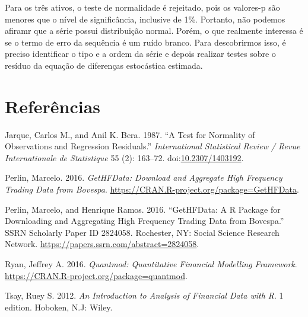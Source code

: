 \documentclass[]{article}
\begin{document}
Para os três ativos, o teste de normalidade é rejeitado, pois os
valores-p são menores que o nível de significância, inclusive de 1\%.
Portanto, não podemos afiramr que a série possui distribuição normal.
Porém, o que realmente interessa é se o termo de erro da sequência é um
ruído branco. Para descobrirmos isso, é preciso identificar o tipo e a
ordem da série e depois realizar testes sobre o resíduo da equação de
diferenças estocástica estimada.

\section*{Referências}\label{referencias}

\setlength{\parindent}{0in}

\hypertarget{refs}{}
\hypertarget{ref-jarqueux5ftestux5f1987}{}
Jarque, Carlos M., and Anil K. Bera. 1987. ``A Test for Normality of
Observations and Regression Residuals.'' \emph{International Statistical
Review / Revue Internationale de Statistique} 55 (2): 163--72.
doi:\href{https://doi.org/10.2307/1403192}{10.2307/1403192}.

\hypertarget{ref-perlinux5fgethfdata:ux5f2016}{}
Perlin, Marcelo. 2016. \emph{GetHFData: Download and Aggregate High
Frequency Trading Data from Bovespa}.
\url{https://CRAN.R-project.org/package=GetHFData}.

\hypertarget{ref-perlinux5fgethfdata:ux5f2016-1}{}
Perlin, Marcelo, and Henrique Ramos. 2016. ``GetHFData: A R Package for
Downloading and Aggregating High Frequency Trading Data from Bovespa.''
SSRN Scholarly Paper ID 2824058. Rochester, NY: Social Science Research
Network. \url{https://papers.ssrn.com/abstract=2824058}.

\hypertarget{ref-ryanux5fquantmod:ux5f2016}{}
Ryan, Jeffrey A. 2016. \emph{Quantmod: Quantitative Financial Modelling
Framework}. \url{https://CRAN.R-project.org/package=quantmod}.

\hypertarget{ref-tsayux5fintroductionux5f2012}{}
Tsay, Ruey S. 2012. \emph{An Introduction to Analysis of Financial Data
with R}. 1 edition. Hoboken, N.J: Wiley.
\end{document}

